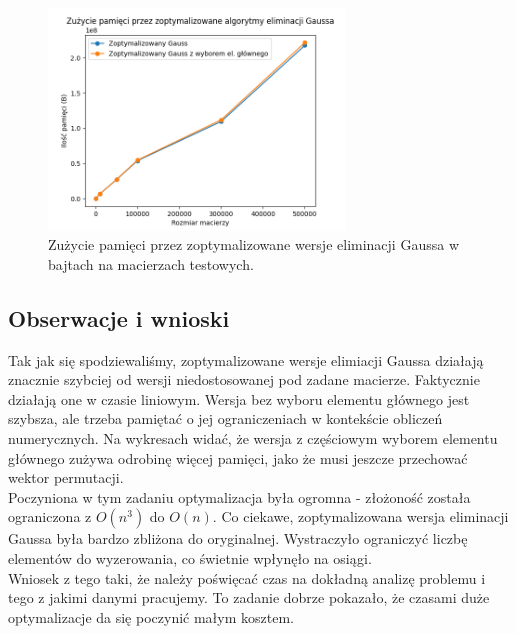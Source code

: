 \documentclass{article}
\begin{document}
\begin{figure}[H]
\centering
\includegraphics[width=0.70\textwidth]{memoryPlot.png}
\caption{Zużycie pamięci przez zoptymalizowane wersje eliminacji Gaussa w bajtach na macierzach testowych.}
\end{figure}

\subsection{Obserwacje i wnioski}
Tak jak się spodziewaliśmy, zoptymalizowane wersje elimiacji Gaussa działają znacznie szybciej od wersji niedostosowanej pod zadane macierze.
Faktycznie działają one w czasie liniowym.
Wersja bez wyboru elementu głównego jest szybsza, ale trzeba pamiętać o jej ograniczeniach w kontekście obliczeń numerycznych.
Na wykresach widać, że wersja z częściowym wyborem elementu głównego zużywa odrobinę więcej pamięci, jako że musi jeszcze przechować wektor permutacji.\\

Poczyniona w tym zadaniu optymalizacja była ogromna - złożoność została ograniczona z $O(n^3)$ do $O(n)$.
Co ciekawe, zoptymalizowana wersja eliminacji Gaussa była bardzo zbliżona do oryginalnej.
Wystraczyło ograniczyć liczbę elementów do wyzerowania, co świetnie wpłynęło na osiągi.\\

Wniosek z tego taki, że należy poświęcać czas na dokładną analizę problemu i tego z jakimi danymi pracujemy.
To zadanie dobrze pokazało, że czasami duże optymalizacje da się poczynić małym kosztem.
\end{document}
